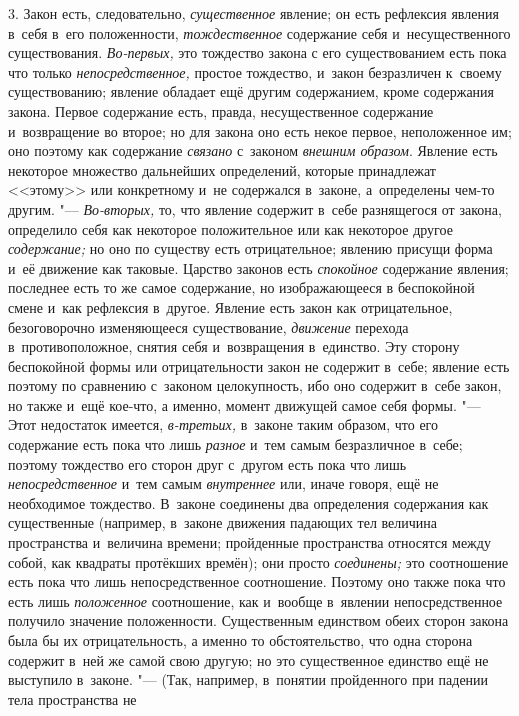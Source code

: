 3. Закон есть, следовательно, {\em существенное}
явление; он есть рефлексия явления в~себя в~его положенности,
{\em тождественное} содержание себя и~несущественного
существования. {\em Во-первых,} это тождество закона с
его существованием есть пока что только
{\em непосредственное,} простое тождество, и~закон
безразличен к~своему существованию; явление обладает ещё другим
содержанием, кроме содержания закона. Первое содержание есть, правда,
несущественное содержание и~возвращение во второе; но для закона оно есть
некое первое, неположенное им; оно поэтому как содержание
{\em связано} с~законом
{\em внешним образом}. Явление есть некоторое множество
дальнейших определений, которые принадлежат <<этому>> или конкретному и~не
содержался в~законе, а~определены чем-то другим. "---
{\em Во-вторых,} то, что явление содержит в~себе
разнящегося от закона, определило себя как некоторое положительное или как
некоторое другое {\em содержание;} но оно по существу
есть отрицательное; явлению присущи форма и~её движение как таковые.
Царство законов есть {\em спокойное} содержание
явления; последнее есть то же самое содержание, но изображающееся в
беспокойной смене и~как рефлексия в~другое. Явление есть закон как
отрицательное, безоговорочно изменяющееся существование,
{\em движение} перехода в~противоположное, снятия себя
и~возвращения в~единство. Эту сторону беспокойной формы или отрицательности
закон не содержит в~себе; явление есть поэтому по сравнению с~законом
целокупность, ибо оно содержит в~себе закон, но также и~ещё кое-что, а
именно, момент движущей самое себя формы. "--- Этот недостаток имеется,
{\em в-третьих,} в~законе таким образом, что его
содержание есть пока что лишь {\em разное} и~тем самым
безразличное в~себе; поэтому тождество его сторон друг с~другом есть пока
что лишь {\em непосредственное} и~тем самым
{\em внутреннее} или, иначе говоря, ещё не необходимое
тождество. В~законе соединены два определения содержания как существенные
(например, в~законе движения падающих тел величина пространства и~величина
времени; пройденные пространства относятся между собой, как квадраты
протёкших времён); они просто {\em соединены;} это
соотношение есть пока что лишь непосредственное соотношение. Поэтому оно
также пока что есть лишь {\em положенное} соотношение,
как и~вообще в~явлении непосредственное получило значение положенности.
Существенным единством обеих сторон закона была бы их отрицательность, а
именно то обстоятельство, что одна сторона содержит в~ней же самой свою
другую; но это существенное единство ещё не выступило в~законе. "--- (Так,
например, в~понятии пройденного при падении тела пространства не
